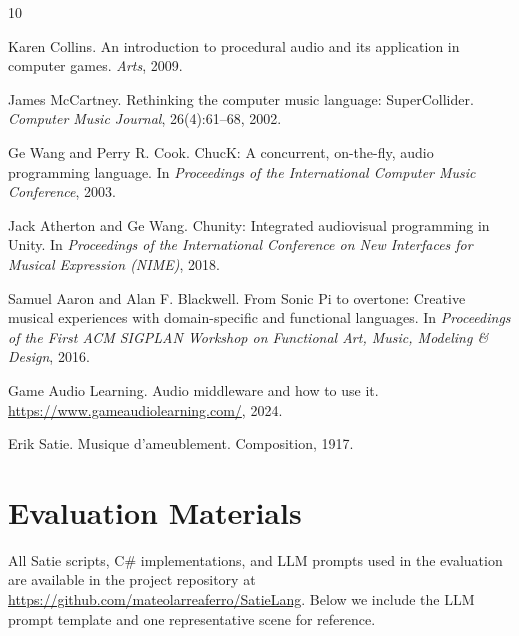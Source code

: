 \documentclass[sigconf,anonymous,review]{nimeart}
\begin{document}

\begin{thebibliography}{10}

Karen Collins.
\newblock An introduction to procedural audio and its application in computer games.
\newblock \emph{Arts}, 2009.

James McCartney.
\newblock Rethinking the computer music language: SuperCollider.
\newblock \emph{Computer Music Journal}, 26(4):61--68, 2002.

Ge Wang and Perry R. Cook.
\newblock ChucK: A concurrent, on-the-fly, audio programming language.
\newblock In \emph{Proceedings of the International Computer Music Conference}, 2003.

Jack Atherton and Ge Wang.
\newblock Chunity: Integrated audiovisual programming in Unity.
\newblock In \emph{Proceedings of the International Conference on New Interfaces for Musical Expression (NIME)}, 2018.

Samuel Aaron and Alan F. Blackwell.
\newblock From Sonic Pi to overtone: Creative musical experiences with domain-specific and functional languages.
\newblock In \emph{Proceedings of the First ACM SIGPLAN Workshop on Functional Art, Music, Modeling \& Design}, 2016.

Game Audio Learning.
\newblock Audio middleware and how to use it.
\newblock \url{https://www.gameaudiolearning.com/}, 2024.

Erik Satie.
\newblock Musique d'ameublement.
\newblock Composition, 1917.

\end{thebibliography}

\appendix

\section{Evaluation Materials}
\label{appendix:eval}

All Satie scripts, C\# implementations, and LLM prompts used in the evaluation are available in the project repository at \url{https://github.com/mateolarreaferro/SatieLang}. Below we include the LLM prompt template and one representative scene for reference.
\end{document}
